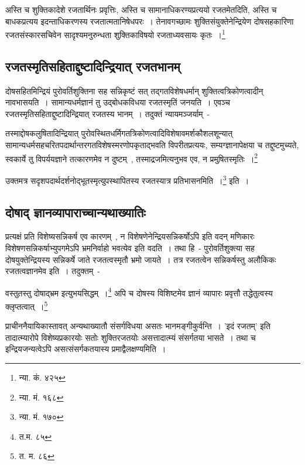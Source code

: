 		{\fontsize{11.7}{0}\selectfont\s अस्ति च शुक्तिकादेशे रजतार्थिनः प्रवृत्तिः, अस्ति च सामानाधिकरण्यप्रत्ययो रजतमेतदिति, अस्ति च बाधकप्रत्यय इदन्ताधिकरणस्य रजतात्मतानिषेधपरः~। तेनावगच्छामः शुक्तिसंयुक्तेनेन्द्रियेण दोषसहकारिणा रजतसंस्कारसचिवेन सादृश्यमनुरुन्धता शुक्तिकाविषयो रजताध्यवसायः कृतः~।\footnote{न्या. कं. ४२५}}

		\subsection{रजतस्मृतिसहिताद्दुष्टादिन्द्रियात् रजतभानम्}

		दोषसहितमिन्द्रियं पुरोवर्तिशुक्तिना सह सन्निकृष्टं सत् तद्गतविशेषधर्मान् शुक्तित्वत्रिकोणत्वादीन् नावभासयति~। सामान्यधर्मज्ञानं तु उद्बोधकविधया रजतस्मृतिं जनयति~। एवञ्च रजतस्मृतिसहिताद्दुष्टादिन्द्रियात् रजतस्य भानम्~। तदुक्तं न्यायमञ्जर्याम्~-

		{\fontsize{11.7}{0}\selectfont\s तस्माद्दोषकलुषितादिन्द्रियात् पुरोवस्थितधर्मिगतत्रिकोणत्वादिविशेषावमर्शकौशलशून्यात् सामान्यधर्मसहचरितपदार्थान्तरगतविशेषस्मरणोपकृताद्भवति विपरीतप्रत्ययः, सम्यग्ज्ञानापेक्षया च तद्दुष्टमुच्यते, स्वकार्ये तु विपर्ययज्ञाने तत्कारणमेव न दुष्टम्~, तस्माद्रजमित्यनुभव एव, न प्रमुषितस्मृतिः~।\footnote{न्या. मं. १६८}}

		{\fontsize{11.7}{0}\selectfont\s उक्तमत्र सदृशपदार्थदर्शनोद्भूतस्मृत्युपस्थापितस्य रजतस्यात्र प्रतिभासनमिति~।\footnote{न्या. मं. १७०}} इति~।

		\subsection{दोषाद् ज्ञानव्यापाराच्चान्यथाख्यातिः}

		प्रत्यक्षं प्रति विशेष्यसन्निकर्ष एव कारणम्~, न विशेषणेनेन्द्रियसन्निकर्षोऽपि इति वदन् मणिकारः विशेषणसन्निकर्षाभ्युपगमेऽपि भ्रमनिर्वाहो भवत्येव इति वदति~। तथा हि~- पुरोवर्तिशुक्त्या सह दोषयुक्तेन्द्रियस्य सन्निकर्षे जाते रजतत्वस्मृतौ भ्रमो जायते~। तत्र रजतत्वेन सन्निकर्षस्तु अलौकिकः रजतत्वज्ञानमेव इति~। तदुक्तम्~-

		{\fontsize{11.7}{0}\selectfont\s वस्तुतस्तु दोषाद्भ्रम इत्युभयसिद्धम्~।\footnote{त.म. ८५} अपि च दोषस्य विशिष्टमेव ज्ञानं व्यापारः प्रवृत्तौ तद्धेतुत्वस्य क्लृप्तत्वात्~।\footnote{त. म. ८६}}

		प्राचीननैयायिकास्तावत् अन्यथाख्यातौ संसर्गविधया असतः भानमङ्गीकुर्वन्ति~। 'इदं रजतम्' इति तादात्म्यारोपे विशेष्यप्रकारयोः सतोः शुक्तिरजतयोः असत्तादात्म्यं संसर्गतया भासते~। तथा च इन्द्रियजन्यत्वेऽपि असत्संसर्गकतयास्य प्रमाद्वैलक्षण्यमिति~।

